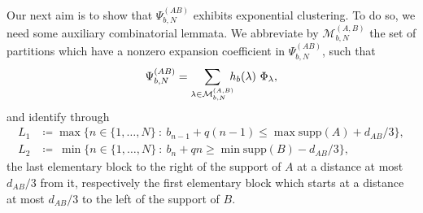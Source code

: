 \documentclass[letterpaper, DIV=17]{scrartcl}
\numberwithin{equation}{section}
\theoremstyle{definition}
\begin{document}
Our next aim is to show that $\Psi_{b,N}^{(AB)}$ exhibits exponential clustering. To do so, we need some auxiliary combinatorial lemmata. We abbreviate by $\mathcal{M}_{b,N}^{(A,B)}$ the set of partitions which have a nonzero expansion coefficient in $\Psi_{b,N}^{(AB)}$, such that 
\begin{equation}
	\Psi_{b,N}^{(AB)} = \sum_{\lambda\in \mathcal{M}_{b,N}^{(A,B)}} \mkern-10mu h_b(\lambda) \ \Phi_\lambda , 
\end{equation}
and identify through
\begin{equation} \label{def L1 L2}
	\begin{split}
		L_1 &\coloneqq \max \{ n\in \{1, \dots, N\} \ : \ b_{n-1}+q(n-1)\leq \max \mathrm{supp}(A)+d_{AB}/3\}, \\
		L_2 &\coloneqq \  \min \{ n\in \{1, \dots, N\} \ : \ b_{n}+qn\geq \min \mathrm{supp}(B)-d_{AB}/3\}, 
	\end{split}
\end{equation}
the last elementary block to the right of the support of $ A $ at a distance at most $ d_{AB}/3 $ from it, respectively the first elementary block which starts at a distance at most $ d_{AB}/3 $ to the left of the support of $ B $.
\end{document}
